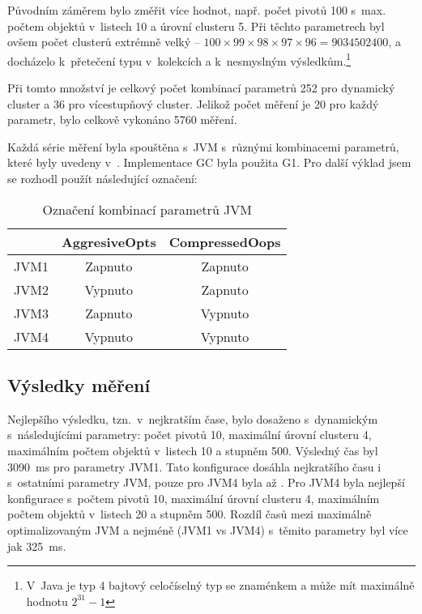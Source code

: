 Původním záměrem bylo změřit více hodnot, např. počet pivotů \num{100} s~max. počtem objektů v~listech \num{10} a úrovní clusteru \num{5}.
Při těchto parametrech byl ovšem počet clusterů extrémně velký -- $100 \times 99 \times 98 \times 97 \times 96 = \num{9034502400}$, a docházelo k~přetečení typu  v~kolekcích a k~nesmyslným výsledkům.\footnote{V~Java je typ  4 bajtový celočíselný typ se znaménkem a může mít maximálně hodnotu $2^{31}-1$}

Při tomto množství je celkový počet kombinací parametrů \num{252} pro dynamický cluster a \num{36} pro vícestupňový cluster.
Jelikož počet měření je \num{20} pro každý parametr, bylo celkově vykonáno \num{5760} měření.

Každá série měření byla spouštěna s~JVM s~různými kombinacemi parametrů, které byly uvedeny v~.
Implementace GC byla použita G1.
Pro další výklad jsem se rozhodl použít následující označení:

\begin{table}[h]
\center
\begin{tabular}{|l  || c | c |}
\hline
& AggresiveOpts & CompressedOops \\ \hline
\hline
JVM1 & Zapnuto & Zapnuto \\ \hline
JVM2 & Vypnuto & Zapnuto \\ \hline
JVM3 & Zapnuto & Vypnuto \\ \hline
JVM4 & Vypnuto & Vypnuto \\ \hline
\end{tabular}
\caption{Označení kombinací parametrů JVM}
\end{table}

\subsection{Výsledky měření}
Nejlepšího výsledku, tzn.~v~nejkratším čase, bylo dosaženo s~dynamickým  s~následujícími parametry: počet pivotů \num{10}, maximální úrovní clusteru \num{4}, maximálním počtem objektů v~listech \num{10} a stupněm \BPTree{} \num{500}.
Výsledný čas byl \SI{3090}{\ms} pro parametry JVM1.
Tato konfigurace dosáhla nejkratšího času i s~ostatními parametry JVM, pouze pro JVM4 byla až .
Pro JVM4 byla nejlepší konfigurace s~počtem pivotů \num{10}, maximální úrovní clusteru \num{4}, maximálním počtem objektů v~listech \num{20} a stupněm \BPTree{} \num{500}.
Rozdíl časů mezi maximálně optimalizovaným JVM a nejméně (JVM1 vs JVM4) s~těmito parametry byl více jak \SI{325}{\ms}.

